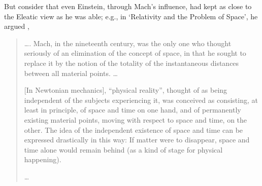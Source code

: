 But consider that even Einstein, through Mach's influence, had kept as close to the Eleatic view as he was able; e.g., in `Relativity and the Problem of Space', he argued \cite{Einstein2001},
\begin{quotation}
\ldots. Mach, in the nineteenth century, was the only one who thought seriously of an elimination of the concept of space, in that he sought to replace it by the notion of the totality of the instantaneous distances between all material points. \ldots

[In Newtonian mechanics], ``physical reality'', thought of as being independent of the subjects experiencing it, was conceived as consisting, at least in principle, of space and time on one hand, and of permanently existing material points, moving with respect to space and time, on the other. The idea of the independent existence of space and time can be expressed drastically in this way: If matter were to disappear, space and time alone would remain behind (as a kind of stage for physical happening).

\ldots 


\end{quotation}
